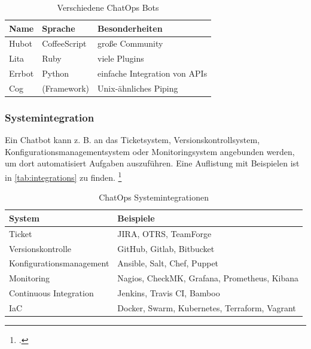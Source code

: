\begin{table}[H]
\centering
\begin{tabularx}{.8\textwidth}{l|l|X}
  Name & Sprache & Besonderheiten\\\hline
  Hubot & CoffeeScript & große Community\\
  Lita & Ruby & viele Plugins\\
  Errbot & Python & einfache Integration von APIs\\
  Cog & (Framework) & Unix-ähnliches Piping\\
\end{tabularx}
\caption{Verschiedene ChatOps Bots}
\label{tab:bots}
\end{table}


\subsubsection{Systemintegration}
Ein Chatbot kann z. B. an das Ticketsystem, Versionskontrollsystem, Konfigurationsmanagementsystem oder Monitoringsystem angebunden werden, um dort automatisiert Aufgaben auszuführen. Eine Auflistung mit Beispielen ist in \autoref{tab:integrations} zu finden.
\footcite[Vgl.][o. \pno]{Zyane_2017_ChatOps}

\begin{table}[H]
\centering
\begin{tabularx}{.8\textwidth}{l|X}
  System & Beispiele \\\hline
  Ticket& JIRA, OTRS, TeamForge \\
  Versionskontrolle & GitHub, Gitlab, Bitbucket\\
  Konfigurationsmanagement & Ansible, Salt, Chef, Puppet\\
  Monitoring & Nagios, CheckMK, Grafana, Prometheus, Kibana\\
  Continuous Integration & Jenkins, Travis CI, Bamboo\\
  \acf{IaC} & Docker, Swarm, Kubernetes, Terraform, Vagrant\\
\end{tabularx}
\caption{ChatOps Systemintegrationen}
\label{tab:integrations}
\end{table}

